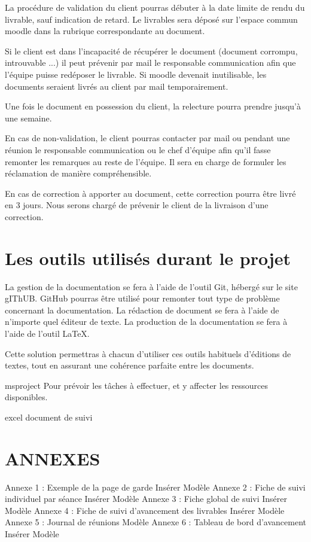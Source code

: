La procédure de validation du client pourras débuter à la date limite de rendu du livrable, sauf indication de retard. Le livrables sera déposé sur l'espace commun moodle dans la rubrique correspondante au document.

Si le client est dans l’incapacité de récupérer le document (document corrompu, introuvable ...) il peut prévenir par mail le responsable communication afin que l’équipe puisse redéposer le livrable.
Si moodle devenait inutilisable, les documents seraient livrés au client par mail temporairement.

Une fois le document en possession du client, la relecture pourra prendre jusqu’à une semaine.

En cas de non-validation, le client pourras contacter par mail ou pendant une réunion le responsable communication ou le chef d’équipe afin qu’il fasse remonter les remarques au reste de l’équipe.
Il sera en charge de formuler les réclamation de manière compréhensible.

En cas de correction à apporter au document, cette correction pourra être livré en 3 jours.
Nous serons chargé de prévenir le client de la livraison d’une correction.

\section{Les outils utilisés durant le projet}

La gestion de la documentation se fera à l’aide de l’outil Git, hébergé sur le site gIThUB.
GitHub pourras être utilisé pour remonter tout type de problème concernant la documentation.
La rédaction de document se fera à l’aide de n’importe quel éditeur de texte.
La production de la documentation se fera à l’aide de l'outil LaTeX.

Cette solution permettras à chacun  d’utiliser ces outils habituels d’éditions de textes, tout en assurant une cohérence parfaite entre les documents.

msproject
Pour prévoir les tâches à effectuer, et y affecter les ressources disponibles.

excel document de suivi



\section{ANNEXES}
Annexe 1 : Exemple de la page de garde
    Insérer Modèle
Annexe 2 : Fiche de suivi individuel par séance
    Insérer Modèle
Annexe 3 : Fiche global de suivi
    Insérer Modèle
Annexe 4 : Fiche de suivi d'avancement des livrables
    Insérer Modèle
Annexe 5 : Journal de réunions
    Modèle
Annexe 6 : Tableau de bord d'avancement
    Insérer Modèle
